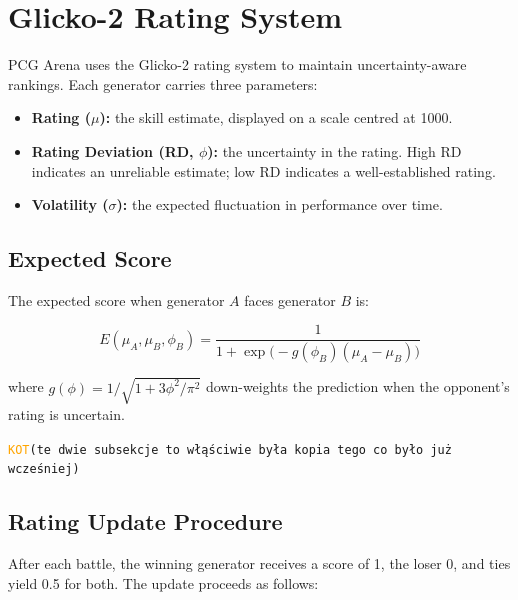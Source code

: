 \documentclass[shortabstract, mgr, english]{iithesis}
\newcommand{\DEBUG}[1]{{#1}} %
\newcommand{\KOT}[1]{\DEBUG{\tt{\textcolor{orange}{KOT}(}{#1}{)}}}
\begin{document}
\section{Glicko-2 Rating System}
\label{sec:sd-rating}

PCG Arena uses the Glicko-2 rating system \cite{glickman2012glicko2} to maintain
uncertainty-aware rankings. Each generator carries three parameters:

\begin{itemize}
    \item \textbf{Rating ($\mu$):} the skill estimate, displayed on a scale centred at 1000.
    \item \textbf{Rating Deviation (RD, $\phi$):} the uncertainty in the rating. High RD
          indicates an unreliable estimate; low RD indicates a well-established rating.
    \item \textbf{Volatility ($\sigma$):} the expected fluctuation in performance over time.
\end{itemize}

\subsection{Expected Score}
\label{subsec:sd-glicko-expected}

The expected score when generator $A$ faces generator $B$ is:

\begin{equation}
\label{eq:glicko-expected}
E(\mu_A, \mu_B, \phi_B) = \frac{1}{1 + \exp\!\bigl(-g(\phi_B)(\mu_A - \mu_B)\bigr)}
\end{equation}

where $g(\phi) = 1 / \sqrt{1 + 3\phi^2/\pi^2}$ down-weights the prediction when
the opponent's rating is uncertain.

\KOT{te dwie subsekcje to włąściwie była kopia tego co było już wcześniej}

\subsection{Rating Update Procedure}
\label{subsec:sd-glicko-update}

After each battle, the winning generator receives a score of 1, the loser 0, and ties
yield 0.5 for both. The update proceeds as follows:
\end{document}

